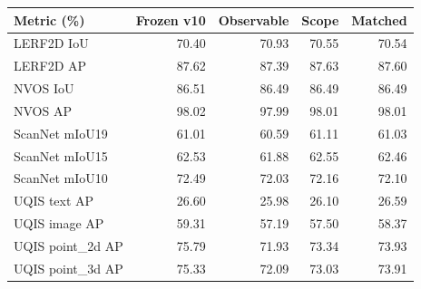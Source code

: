 \begin{tabular}{lrrrr}
\toprule
Metric (\%) & Frozen v10 & Observable & Scope & Matched \\
\midrule
LERF2D IoU & 70.40 & 70.93 & 70.55 & 70.54 \\
LERF2D AP & 87.62 & 87.39 & 87.63 & 87.60 \\
NVOS IoU & 86.51 & 86.49 & 86.49 & 86.49 \\
NVOS AP & 98.02 & 97.99 & 98.01 & 98.01 \\
ScanNet mIoU19 & 61.01 & 60.59 & 61.11 & 61.03 \\
ScanNet mIoU15 & 62.53 & 61.88 & 62.55 & 62.46 \\
ScanNet mIoU10 & 72.49 & 72.03 & 72.16 & 72.10 \\
UQIS text AP & 26.60 & 25.98 & 26.10 & 26.59 \\
UQIS image AP & 59.31 & 57.19 & 57.50 & 58.37 \\
UQIS point\_2d AP & 75.79 & 71.93 & 73.34 & 73.93 \\
UQIS point\_3d AP & 75.33 & 72.09 & 73.03 & 73.91 \\
\bottomrule
\end{tabular}

